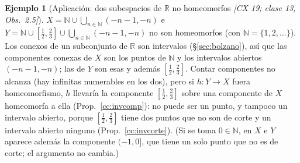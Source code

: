 \documentclass[11pt,a4paper]{article}
\newcommand{\figtit}[1]{\par\vspace{2pt}{\footnotesize\itshape #1}\par}
\theoremstyle{definition}
\newtheorem{ejemplo}[definicion]{Ejemplo}
\theoremstyle{plain}
\newcommand{\fnt}[1]{{\normalfont\small\itshape\color{gray!150!black}[#1]}}
\newcommand{\R}{\mathbb{R}}
\newcommand{\N}{\mathbb{N}}
\begin{document}
\begin{figure}[ht]
\centering
{}
\figtit{Figura 28. Clase 13: la circunferencia con las rectas $y=\pm x$ es unión de tres arcoconexos que se cortan, luego arcoconexa y por lo tanto conexa.}
\end{figure}

\begin{ejemplo}[Aplicación: dos subespacios de $\R$ no homeomorfos \fnt{CX 19; clase 13, Obs.\ 2.5}]\label{cc:cx19}
$X=\N\cup\bigcup_{n\in\N}(-n-1,-n)$ e $Y=\N\cup[\frac12,\frac23]\cup\bigcup_{n\in\N}(-n-1,-n)$ no son homeomorfos (con $\N=\{1,2,\dots\}$). Los conexos de un subconjunto de $\R$ son intervalos (\S\ref{sec:bolzano}), así que las componentes conexas de $X$ son los puntos de $\N$ y los intervalos abiertos $(-n-1,-n)$; las de $Y$ son esas y además $[\frac12,\frac23]$. Contar componentes no alcanza (hay infinitas numerables en los dos), pero si $h:Y\to X$ fuera homeomorfismo, $h$ llevaría la componente $[\frac12,\frac23]$ sobre una componente de $X$ homeomorfa a ella (Prop.~\ref{cc:invcomp}): no puede ser un punto, y tampoco un intervalo abierto, porque $[\frac12,\frac23]$ tiene dos puntos que no son de corte y un intervalo abierto ninguno (Prop.~\ref{cc:invcorte}). (Si se toma $0\in\N$, en $X$ e $Y$ aparece además la componente $(-1,0]$, que tiene un solo punto que no es de corte; el argumento no cambia.)
\end{ejemplo}
\end{document}
